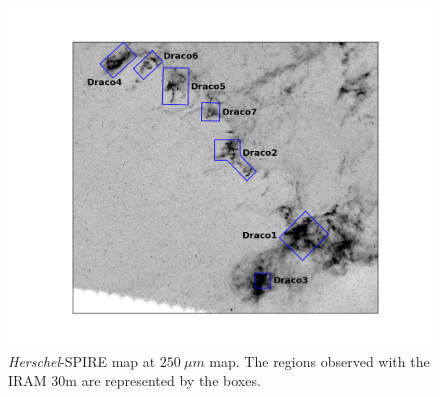 \documentclass[traditabstract]{aa}
\begin{document}
%

\begin{figure}[h!]
  \centering
  \includegraphics[width=0.7\linewidth,trim=165 85 135 85,clip=true]{Figures/Draco_overview.png}
  \caption{\label{overview} \emph{Herschel}-SPIRE map at $250\: \mu m$ map. The regions observed with the IRAM 30m are represented by the boxes.}
\end{figure}
\end{document}
